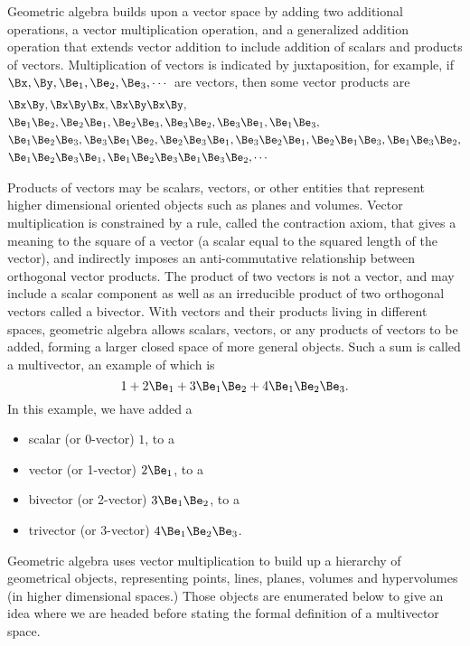 %
%
Geometric algebra builds upon a vector space by adding two additional operations, a vector multiplication operation, and a generalized addition operation that extends vector addition to include addition of scalars and products of vectors.
Multiplication of vectors is indicated by juxtaposition, for example, if \( \Bx, \By, \Be_1, \Be_2, \Be_3, \cdots \) are vectors, then some vector products are
\begin{equation}\label{eqn:multivector:20}
\begin{aligned}
&\Bx \By, \Bx \By \Bx, \Bx \By \Bx \By, \\
&\Be_1 \Be_2, \Be_2 \Be_1, \Be_2 \Be_3, \Be_3 \Be_2, \Be_3 \Be_1, \Be_1 \Be_3, \\
&\Be_1 \Be_2 \Be_3, \Be_3 \Be_1 \Be_2, \Be_2 \Be_3 \Be_1, \Be_3 \Be_2 \Be_1, \Be_2 \Be_1 \Be_3, \Be_1 \Be_3 \Be_2, \\
&\Be_1 \Be_2 \Be_3 \Be_1, \Be_1 \Be_2 \Be_3 \Be_1 \Be_3 \Be_2, \cdots
\end{aligned}
\end{equation}

Products of vectors may be scalars, vectors, or other entities that represent higher dimensional oriented objects such as planes and volumes.
Vector multiplication is constrained by a rule, called the contraction axiom, that gives a meaning to the square of a vector (a scalar equal to the squared length of the vector), and indirectly imposes an anti-commutative relationship between orthogonal vector products.
%
The product of two vectors is not a vector, and may include a scalar component as well as an irreducible product of two orthogonal vectors called a bivector.
With vectors and their products living in different spaces,
geometric algebra allows scalars, vectors, or any products of vectors to be added, forming a larger closed space of more general objects.  Such a sum is called a multivector, an example of which is
\begin{equation}\label{eqn:multivector:40}
1 + 2 \Be_1 + 3 \Be_1 \Be_2 + 4 \Be_1 \Be_2 \Be_3.
\end{equation}
In this example, we have added a
\begin{itemize}
\item
scalar (or 0-vector) \( 1 \), to a
\item
vector (or 1-vector) \( 2 \Be_1 \), to a
\item
bivector (or 2-vector) \( 3 \Be_1 \Be_2 \), to a
\item
trivector (or 3-vector) \( 4 \Be_1 \Be_2 \Be_3 \).
\end{itemize}
Geometric algebra uses vector multiplication to build up a hierarchy of geometrical objects, representing points, lines, planes, volumes and hypervolumes (in higher dimensional spaces.)  Those objects are enumerated below to give an idea where we are headed before stating the formal definition of a multivector space.

